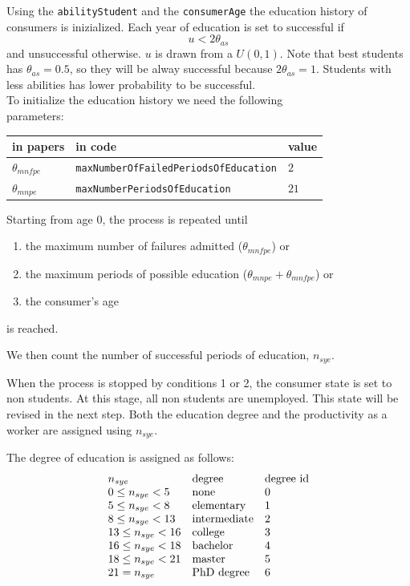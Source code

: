 \documentclass{article}
\begin{document}
\vskip5mm
Using the \verb+abilityStudent+ and the \verb+consumerAge+ the education history of consumers is inizialized. Each year of education is set to successful if
\[
	u<2\theta_{as}
\]
and unsuccessful otherwise. $u$ is drawn from a $U(0,1)$. Note that best students has $\theta_{as}=0.5$, so they will be alway successful because $2\theta_{as}=1$. Students with less abilities has lower probability to be successful.\\

To initialize the education history we need the following\\ 
parameters:\\
\begin{tabular}{l l l}
	\hline
	in papers& in code&value\\
	\hline
	\hline
 $\theta_{mnfpe}$&\verb+maxNumberOfFailedPeriodsOfEducation+&$2$\\
 $\theta_{mnpe}$&\verb+maxNumberPeriodsOfEducation+&$21$\\
	\hline
\end{tabular}

\vskip5mm
Starting from age 0, the process is repeated until 
\begin{enumerate}
	\item the maximum number of failures admitted ($\theta_{mnfpe}$) or
	\item the maximum periods of possible education ($\theta_{mnpe}+\theta_{mnfpe}$) or
	\item the consumer's age 
\end{enumerate}
is reached.

We then count the number of successful periods of education, $n_{sye}$. 

When the process is stopped by conditions 1 or 2, the consumer state is set to non students. At this stage, all non students are unemployed. This state will be revised in the next step. Both the education degree and the productivity as a worker are assigned using $n_{sye}$. 

The degree of education is assigned as follows:
\[
	\begin{array}{l l l}
		n_{sye}& \textnormal{degree}& \textnormal{degree id}\\
	0\le n_{sye}<5 & \textnormal{none}&0\\
	5\le n_{sye}<8 & \textnormal{elementary}&1\\
	8\le n_{sye}<13 & \textnormal{intermediate}&2\\
	13\le n_{sye}<16 & \textnormal{college}&3\\
	16\le n_{sye}<18 & \textnormal{bachelor}&4\\
	18\le n_{sye}<21 & \textnormal{master}&5\\
	21= n_{sye} & \textnormal{PhD degree}&6
	\end{array}
\]
\end{document}
